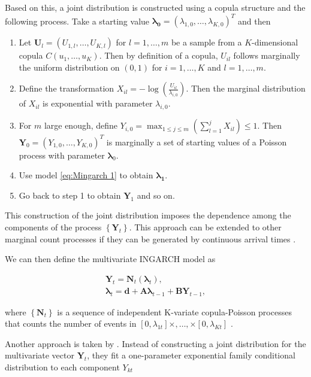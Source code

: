 Based on this, a joint distribution is constructed using a copula structure and the following process. Take a starting value $\bm{\lambda_0}=(\lambda_{1,0},\ldots,\lambda_{K,0})^T$ and then \cite{Fokianos:2020}

\begin{enumerate}
	\item Let $\bm{U}_l=(U_{1,l},\ldots,U_{K,l})$ for $l=1,\ldots,m$ be a sample from a $K$-dimensional copula $C(u_1,\ldots,u_K)$. Then by definition of a copula, $U_{il}$ follows marginally the uniform distribution on $(0,1)$ for $i=1,\ldots,K$ and $l=1,\ldots,m$. 
	\item Define the transformation $X_{il} = -\log (\frac{U_{il}}{\lambda_{i,0}})$. Then the marginal distribution of $X_{il}$ is exponential with parameter $\lambda_{i,0}$. 
	\item For $m$ large enough, define $Y_{i,0} = \max_{1\leq j \leq m}(\sum_{l=1}^j X_{il})\leq 1$. Then $\bm{Y}_0=(Y_{1,0},\ldots,Y_{K,0})^T$ is marginally a set of starting values of a Poisson process with parameter $\bm{\lambda}_0$. 
	\item Use model \ref{eq:Mingarch 1} to obtain $\bm{\lambda_1}$.
	\item Go back to step 1 to obtain $\bm{Y}_1$ and so on. 
\end{enumerate}

This construction of the joint distribution imposes the dependence among the components of the process $\left\{\bm{Y}_t\right\}$. This approach can be extended to other marginal count processes if they can be generated by continuous arrival times \cite{Fokianos:2020}. 

We can then define the multivariate INGARCH model as

\begin{equation}
\begin{gathered}
\bm{Y}_t = \bm{N}_t(\bm{\lambda}_t), \\
\bm{\lambda}_t = \bm{d} + \bm{A}\bm{\lambda}_{t-1} + \bm{B}\bm{Y}_{t-1},
\label{eq:Mingarch 1 new}
\end{gathered}
\end{equation}

where $\left\{\bm{N}_t\right\}$ is a sequence of independent K-variate copula-Poisson processes that counts the number of events in $[0,\lambda_{1t}]\times,\ldots,\times[0,\lambda_{Kt}]$ \cite{Fokianos:2020}. 

Another approach is taken by \cite{Lee:2023}. Instead of constructing a joint distribution for the multivariate vector $\bm{Y}_t$, they fit a one-parameter exponential family conditional distribution to each component $Y_{kt}$

